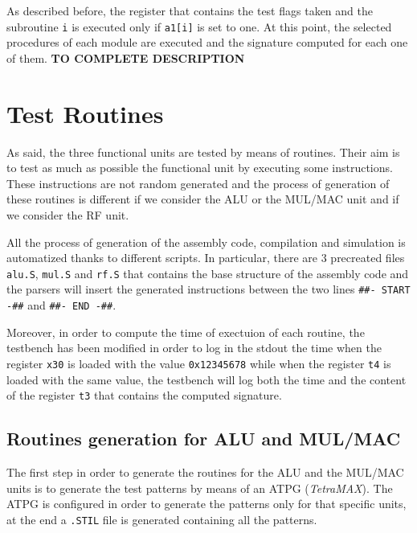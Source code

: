 \documentclass[paper=a4, fontsize=10pt]{scrartcl}	%
\begin{document}
	As described before, the register that contains the test flags taken and the subroutine \texttt{i} is executed only if \texttt{a1[i]} is set to one. At this point, the selected procedures of each module are executed and the signature computed for each one of them. \newline\newline\textbf{TO COMPLETE DESCRIPTION}

	\section{Test Routines}
	As said, the three functional units are tested by means of routines. Their aim is to test as much as possible the functional unit by executing some instructions. These instructions are not random generated and the process of generation of these routines is different if we consider the ALU or the MUL/MAC unit and if we consider the RF unit. \newline

	All the process of generation of the assembly code, compilation and simulation is automatized thanks to different scripts. In particular, there are 3 precreated files \texttt{alu.S}, \texttt{mul.S} and \texttt{rf.S} that contains the base structure of the assembly code and the parsers will insert the generated instructions between the two lines \texttt{\#\#- START -\#\#} and \texttt{\#\#- END -\#\#}.\newline

	Moreover, in order to compute the time of exectuion of each routine, the testbench has been modified in order to log in the stdout the time when the register \texttt{x30} is loaded with the value \texttt{0x12345678} while when the register \texttt{t4} is loaded with the same value, the testbench will log both the time and the content of the register \texttt{t3} that contains the computed signature.

	\subsection{Routines generation for ALU and MUL/MAC}
	The first step in order to generate the routines for the ALU and the MUL/MAC units is to generate the test patterns by means of an ATPG (\textit{TetraMAX}). The ATPG is configured in order to generate the patterns only for that specific units, at the end a \texttt{.STIL} file is generated containing all the patterns. \newline
\end{document}
